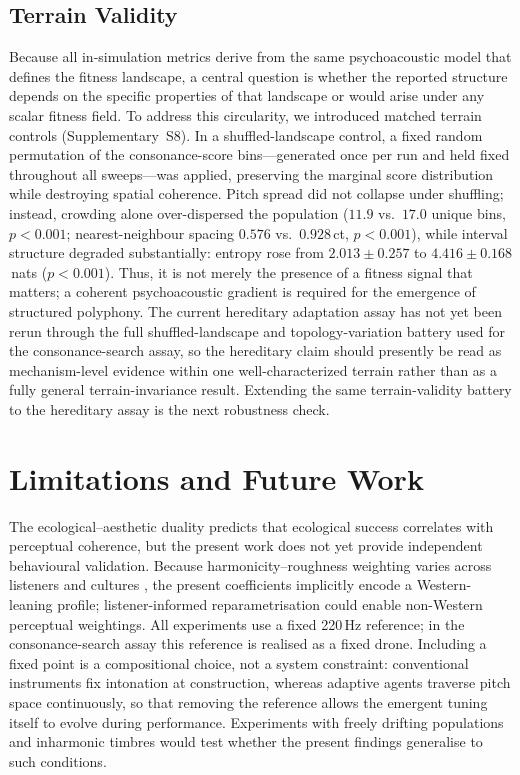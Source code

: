 \documentclass[letterpaper]{article}
\begin{document}
\subsection{Terrain Validity}

Because all in-simulation metrics derive from the same psychoacoustic model that defines the fitness landscape, a central question is whether the reported structure depends on the specific properties of that landscape or would arise under any scalar fitness field. To address this circularity, we introduced matched terrain controls (Supplementary~S8).
In a shuffled-landscape control, a fixed random permutation of the consonance-score bins---generated once per run and held fixed throughout all sweeps---was applied, preserving the marginal score distribution while destroying spatial coherence.
Pitch spread did not collapse under shuffling; instead, crowding alone over-dispersed the population ($11.9$ vs.\ $17.0$ unique bins, $p < 0.001$; nearest-neighbour spacing $0.576$ vs.\ $0.928$\,ct, $p < 0.001$), while interval structure degraded substantially: entropy rose from $2.013 \pm 0.257$ to $4.416 \pm 0.168$\,nats ($p < 0.001$).
Thus, it is not merely the presence of a fitness signal that matters; a coherent psychoacoustic gradient is required for the emergence of structured polyphony.
The current hereditary adaptation assay has not yet been rerun through the full shuffled-landscape and topology-variation battery used for the consonance-search assay, so the hereditary claim should presently be read as mechanism-level evidence within one well-characterized terrain rather than as a fully general terrain-invariance result. Extending the same terrain-validity battery to the hereditary assay is the next robustness check.

\section{Limitations and Future Work}
\label{sec:limits}

The ecological--aesthetic duality predicts that ecological success correlates with perceptual coherence, but the present work does not yet provide independent behavioural validation. Because harmonicity--roughness weighting varies across listeners and cultures \citep{mcdermott2016}, the present coefficients implicitly encode a Western-leaning profile; listener-informed reparametrisation could enable non-Western perceptual weightings. All experiments use a fixed 220\,Hz reference; in the consonance-search assay this reference is realised as a fixed drone. Including a fixed point is a compositional choice, not a system constraint: conventional instruments fix intonation at construction, whereas adaptive agents traverse pitch space continuously, so that removing the reference allows the emergent tuning itself to evolve during performance. Experiments with freely drifting populations and inharmonic timbres would test whether the present findings generalise to such conditions.
\end{document}
